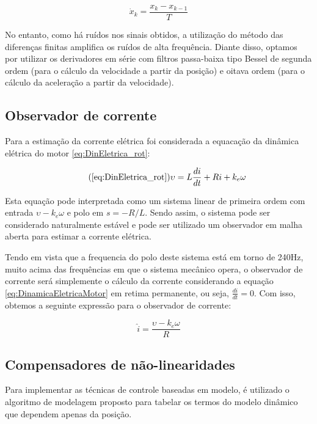 \documentclass[]{politex}
\begin{document}
\begin{equation}
\dot{x}_k = \frac{x_k - x_{k-1}}{T}
\end{equation}

No entanto, como há ruídos nos sinais obtidos, a utilização  do método das diferenças finitas amplifica os ruídos de alta frequência. Diante disso, optamos por utilizar os derivadores em série com filtros passa-baixa tipo Bessel de segunda ordem (para o cálculo da velocidade a partir da posição) e oitava ordem (para o cálculo da aceleração a partir da velocidade).

\subsection{Observador de corrente}

Para a estimação da corrente elétrica foi considerada a equacação da dinâmica elétrica do motor \eqref{eq:DinEletrica_rot}:

\begin{equation}
\tag{\ref{eq:DinEletrica_rot}} \label{eq:DinamicaEletricaMotor}
	   \upsilon = L \frac{di}{dt} + R i + k_{e} \omega
\end{equation}

Esta equação pode interpretada como um sistema linear de primeira ordem com entrada $\upsilon - k_{e} \omega $ e polo em $s = -R/L$. Sendo assim, o sistema pode ser considerado naturalmente estável e pode ser utilizado um observador em malha aberta para estimar a corrente elétrica.

Tendo em vista que a frequencia do polo deste sistema está em torno de 240Hz, muito acima das frequências em que o sistema mecânico opera, o observador de corrente será simplemente o cálculo da corrente considerando a equação \eqref{eq:DinamicaEletricaMotor} em retima permanente, ou seja, $\frac{di}{dt} = 0$. Com isso, obtemos a seguinte expressão para o observador de corrente:

\begin{equation}
\label{corrente}
\hat{i} = \frac{\upsilon - k_e \omega}{R}
\end{equation}

\subsection{Compensadores de não-linearidades}

Para implementar as técnicas de controle baseadas em modelo, é utilizado o algoritmo de modelagem proposto para tabelar os termos do modelo dinâmico que dependem apenas da posição.
\end{document}
